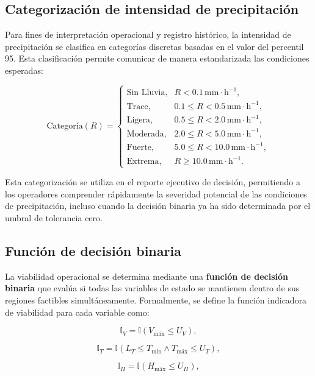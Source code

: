 \documentclass[
  spanish,
  us-letterpaper,
]{scrreprt}
\numberwithin{equation}{section}
\begin{document}
\subsection{Categorización de intensidad de
precipitación}\label{categorizaciuxf3n-de-intensidad-de-precipitaciuxf3n}

Para fines de interpretación operacional y registro histórico, la
intensidad de precipitación se clasifica en categorías discretas basadas
en el valor del percentil 95. Esta clasificación permite comunicar de
manera estandarizada las condiciones esperadas:

\[
\text{Categoría}(R) = 
\begin{cases}
\text{Sin Lluvia}, & R < 0.1 \, \mathrm{mm \cdot h^{-1}}, \\
\text{Trace}, & 0.1 \leq R < 0.5 \, \mathrm{mm \cdot h^{-1}}, \\
\text{Ligera}, & 0.5 \leq R < 2.0 \, \mathrm{mm \cdot h^{-1}}, \\
\text{Moderada}, & 2.0 \leq R < 5.0 \, \mathrm{mm \cdot h^{-1}}, \\
\text{Fuerte}, & 5.0 \leq R < 10.0 \, \mathrm{mm \cdot h^{-1}}, \\
\text{Extrema}, & R \geq 10.0 \, \mathrm{mm \cdot h^{-1}}.
\end{cases}
\]

Esta categorización se utiliza en el reporte ejecutivo de decisión,
permitiendo a los operadores comprender rápidamente la severidad
potencial de las condiciones de precipitación, incluso cuando la
decisión binaria ya ha sido determinada por el umbral de tolerancia
cero.

\subsection{Función de decisión
binaria}\label{funciuxf3n-de-decisiuxf3n-binaria}

La viabilidad operacional se determina mediante una \textbf{función de
decisión binaria} que evalúa si todas las variables de estado se
mantienen dentro de sus regiones factibles simultáneamente. Formalmente,
se define la función indicadora de viabilidad para cada variable como:

\[
\mathbb{I}_V = \mathbb{I}\left( V_{\text{máx}} \leq U_V \right),
\]

\[
\mathbb{I}_T = \mathbb{I}\left( L_T \leq T_{\text{mín}} \land T_{\text{máx}} \leq U_T \right),
\]

\[
\mathbb{I}_H = \mathbb{I}\left( H_{\text{máx}} \leq U_H \right),
\]
\end{document}
